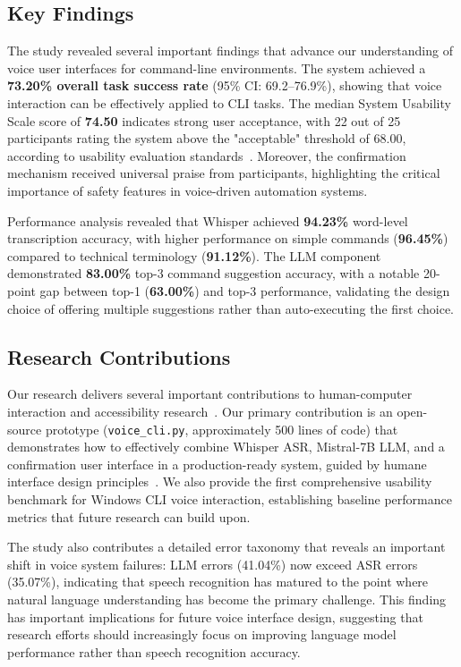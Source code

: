 \documentclass[a4paper,12pt]{article}
\begin{document}
\subsection{Key Findings}

The study revealed several important findings that advance our understanding of voice user interfaces for command-line environments. The system achieved a \textbf{73.20\% overall task success rate} (95\% CI: 69.2–76.9\%), showing that voice interaction can be effectively applied to CLI tasks. The median System Usability Scale score of \textbf{74.50} indicates strong user acceptance, with 22 out of 25 participants rating the system above the "acceptable" threshold of 68.00, according to usability evaluation standards~\cite{ref15}. Moreover, the confirmation mechanism received universal praise from participants, highlighting the critical importance of safety features in voice-driven automation systems.

Performance analysis revealed that Whisper achieved \textbf{94.23\%} word-level transcription accuracy, with higher performance on simple commands (\textbf{96.45\%}) compared to technical terminology (\textbf{91.12\%}). The LLM component demonstrated \textbf{83.00\%} top-3 command suggestion accuracy, with a notable 20-point gap between top-1 (\textbf{63.00\%}) and top-3 performance, validating the design choice of offering multiple suggestions rather than auto-executing the first choice.

\subsection{Research Contributions}

Our research delivers several important contributions to human-computer interaction and accessibility research~\cite{ref16,ref22}. Our primary contribution is an open-source prototype (\texttt{voice\_cli.py}, approximately 500 lines of code) that demonstrates how to effectively combine Whisper ASR, Mistral-7B LLM, and a confirmation user interface in a production-ready system, guided by humane interface design principles~\cite{ref20}. We also provide the first comprehensive usability benchmark for Windows CLI voice interaction, establishing baseline performance metrics that future research can build upon.

The study also contributes a detailed error taxonomy that reveals an important shift in voice system failures: LLM errors (41.04\%) now exceed ASR errors (35.07\%), indicating that speech recognition has matured to the point where natural language understanding has become the primary challenge. This finding has important implications for future voice interface design, suggesting that research efforts should increasingly focus on improving language model performance rather than speech recognition accuracy.
\end{document}
